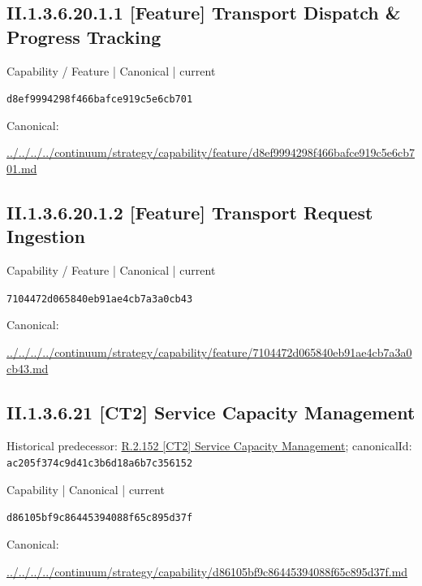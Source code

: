 \documentclass[10pt,a4paper]{article}
\begin{document}
\subsection*{II.1.3.6.20.1.1 [Feature] Transport Dispatch \& Progress Tracking}
\label{element-d8ef9994298f466bafce919c5e6cb701}
{\small Capability / Feature | Canonical | current}\par
\texttt{d8ef9994298f466bafce919c5e6cb701}\par
Canonical: \par
{\footnotesize\url{../../../../continuum/strategy/capability/feature/d8ef9994298f466bafce919c5e6cb701.md}}\par
\subsection*{II.1.3.6.20.1.2 [Feature] Transport Request Ingestion}
\label{element-7104472d065840eb91ae4cb7a3a0cb43}
{\small Capability / Feature | Canonical | current}\par
\texttt{7104472d065840eb91ae4cb7a3a0cb43}\par
Canonical: \par
{\footnotesize\url{../../../../continuum/strategy/capability/feature/7104472d065840eb91ae4cb7a3a0cb43.md}}\par
\subsection*{II.1.3.6.21 [CT2] Service Capacity Management}
Historical predecessor: \hyperref[element-ac205f374c9d41c3b6d18a6b7c356152]{R.2.152 [CT2] Service Capacity Management}; canonicalId: \texttt{ac205f374c9d41c3b6d18a6b7c356152}\par
\label{element-d86105bf9c86445394088f65c895d37f}
{\small Capability | Canonical | current}\par
\texttt{d86105bf9c86445394088f65c895d37f}\par
Canonical: \par
{\footnotesize\url{../../../../continuum/strategy/capability/d86105bf9c86445394088f65c895d37f.md}}\par
\end{document}
